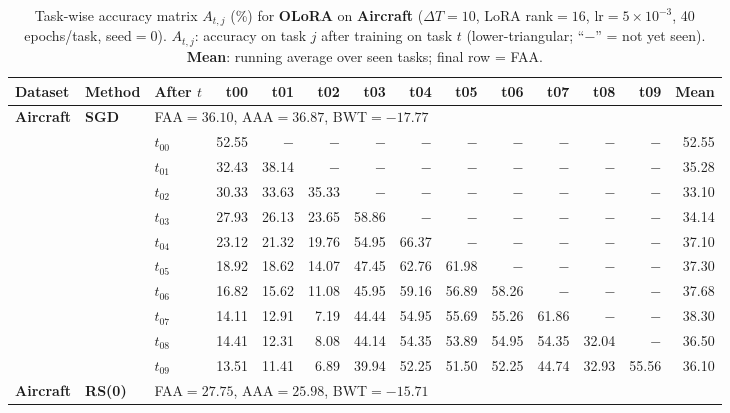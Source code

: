 \begin{table}[ht]
\centering
\caption{%
  Task-wise accuracy matrix $A_{t,j}$ (\%) for \textbf{OLoRA} on \textbf{Aircraft} ($\Delta T=10$, LoRA rank$=16$, lr$=5\times10^{-3}$, 40 epochs/task, seed$=0$).
  $A_{t,j}$: accuracy on task $j$ after training on task $t$  (lower-triangular; ``$-$'' = not yet seen).
  \textbf{Mean}: running average over seen tasks; final row = FAA.
}
\label{tab:raw_olora_aircraft}
\setlength{\tabcolsep}{2.8pt}
\renewcommand{\arraystretch}{0.88}
\scriptsize
\begin{tabular}{@{}l l l *{11}{r}@{}}
\toprule
\textbf{Dataset} & \textbf{Method} & \textbf{After $t$} & \textbf{t00} & \textbf{t01} & \textbf{t02} & \textbf{t03} & \textbf{t04} & \textbf{t05} & \textbf{t06} & \textbf{t07} & \textbf{t08} & \textbf{t09} & \textbf{Mean} \\
\midrule
\multirow{11}{*}{\textbf{Aircraft}} & \multirow{11}{*}{\textbf{SGD}} & \multicolumn{12}{l}{\quad\small FAA$=36.10$,\; AAA$=36.87$,\; BWT$=-17.77$} \\
 & & $t_{00}$ & 52.55 & $-$ & $-$ & $-$ & $-$ & $-$ & $-$ & $-$ & $-$ & $-$ & 52.55 \\
 & & $t_{01}$ & 32.43 & 38.14 & $-$ & $-$ & $-$ & $-$ & $-$ & $-$ & $-$ & $-$ & 35.28 \\
 & & $t_{02}$ & 30.33 & 33.63 & 35.33 & $-$ & $-$ & $-$ & $-$ & $-$ & $-$ & $-$ & 33.10 \\
 & & $t_{03}$ & 27.93 & 26.13 & 23.65 & 58.86 & $-$ & $-$ & $-$ & $-$ & $-$ & $-$ & 34.14 \\
 & & $t_{04}$ & 23.12 & 21.32 & 19.76 & 54.95 & 66.37 & $-$ & $-$ & $-$ & $-$ & $-$ & 37.10 \\
 & & $t_{05}$ & 18.92 & 18.62 & 14.07 & 47.45 & 62.76 & 61.98 & $-$ & $-$ & $-$ & $-$ & 37.30 \\
 & & $t_{06}$ & 16.82 & 15.62 & 11.08 & 45.95 & 59.16 & 56.89 & 58.26 & $-$ & $-$ & $-$ & 37.68 \\
 & & $t_{07}$ & 14.11 & 12.91 & 7.19 & 44.44 & 54.95 & 55.69 & 55.26 & 61.86 & $-$ & $-$ & 38.30 \\
 & & $t_{08}$ & 14.41 & 12.31 & 8.08 & 44.14 & 54.35 & 53.89 & 54.95 & 54.35 & 32.04 & $-$ & 36.50 \\
 & & $t_{09}$ & 13.51 & 11.41 & 6.89 & 39.94 & 52.25 & 51.50 & 52.25 & 44.74 & 32.93 & 55.56 & 36.10 \\
\midrule
\multirow{11}{*}{\textbf{Aircraft}} & \multirow{11}{*}{\textbf{RS(0)}} & \multicolumn{12}{l}{\quad\small FAA$=27.75$,\; AAA$=25.98$,\; BWT$=-15.71$} \\

\end{tabular}
\end{table}

